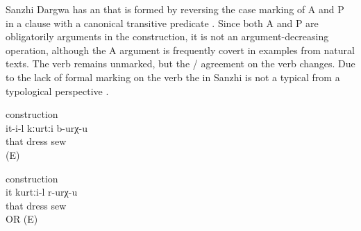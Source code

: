 Sanzhi Dargwa has an  that is formed by reversing the case marking of A and P in a clause with a canonical transitive predicate . Since both A and P are obligatorily arguments in the  construction, it is not an argument-decreasing operation, although the A argument is frequently covert in examples from natural texts. The verb remains unmarked, but the / agreement on the verb changes. Due to the lack of formal marking on the verb the  in Sanzhi is not a typical  from a typological perspective \citep{Polinsky2005}. 
%
\begin{exe}

		\ex	{} construction \label{ex:S/he sews a dress@63a}\\
		\gll	it-i-l	kːurtːi	b-urχ-u\\
			that	dress	sew\\
		\glt	{} (E) 

		\ex	{} construction \label{ex:She is a dressmaker@63b}\\
		\gll	it	kurtːi-l	r-urχ-u \\
			that	dress	sew\\
		\glt	{} OR  (E)

\end{exe}

